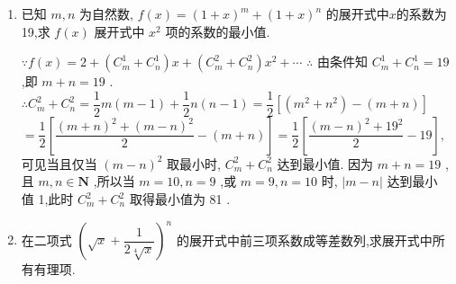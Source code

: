\begin{enumerate}
\begin{jieda}
    \begin{enumerate}
        \item  $x$ 3的二项式系数是 ${C}_{n}^{3}$ , $x$ 的二项式系数是 ${C}_{n}^{1}$ .依题意有 ${C}_{n}^{3} = 7{C}_{n}^{1}$ ,即 $\dfrac{n\left( {n - 1}\right) \left( {n - 2}\right) }{3!} = {7n}$ .整理,得${n}^{2} - {3n} - {40} = 0,$解得 $n = 8$ . (舍去 $n =  - 5$ .)
        \item 依题意,得
${C}_{7}^{5}{a}^{2} + {C}_{7}^{3}{a}^{4} = 2{C}_{7}^{4}{a}^{3},$即 ${21}{a}^{2} + {35}{a}^{4} = {70}{a}^{3}$ ,
$\because a \neq  0$ ,
$\therefore 5{a}^{2} - {10a} + 3 = 0$ .
解得 $a = 1 - \dfrac{\sqrt{10}}{5}$ 或 $a = 1 + \dfrac{\sqrt{10}}{5}$ .
    \end{enumerate}
\end{jieda}



\item 已知 $m,n$ 为自然数, $f(x)=(1+x)^{m}+(1+x)^{n}$ 的展开式中$x$的系数为19,求 $f(x)$ 展开式中 $x^{2}$ 项的系数的最小值.
\begin{jieda}
     $\because f\left( x\right)  = 2 + \left( {{{C}}_{m}^{1} + {{C}}_{n}^{1}}\right) x + \left( {{{C}}_{m}^{2} + {{C}}_{n}^{2}}\right) {x}^{2} + \cdots$
$\therefore$ 由条件知 ${{C}}_{m}^{1} + {{C}}_{n}^{1} = {19}$ ,即 $m + n = {19}$ .
$\therefore {{C}}_{m}^{2} + {{C}}_{n}^{2} = \dfrac{1}{2}m\left( {m - 1}\right)  + \dfrac{1}{2}n\left( {n - 1}\right)  = \dfrac{1}{2}\left\lbrack  {\left( {{m}^{2} + {n}^{2}}\right)  - \left( {m + n}\right) }\right\rbrack$
$= \dfrac{1}{2}\left\lbrack  {\dfrac{{\left( m + n\right) }^{2} + {\left( m - n\right) }^{2}}{2} - \left( {m + n}\right) }\right\rbrack   = \dfrac{1}{2}\left\lbrack  {\dfrac{{\left( m - n\right) }^{2} + {19}^{2}}{2} - {19}}\right\rbrack  ,$
可见当且仅当 ${\left( m - n\right) }^{2}$ 取最小时, ${{C}}_{m}^{2} + {{C}}_{n}^{2}$ 达到最小值.
因为 $m + n = {19}$ ,且 $m,n \in  \mathbf{N}$ ,所以当 $m = {10},n = 9$ ,或 $m = 9,n = {10}$ 时, $\left| {m - n}\right|$ 达到最小
值 1,此时 ${{C}}_{m}^{2} + {{C}}_{n}^{2}$ 取得最小值为 81 .
\end{jieda}



\item 在二项式 $(\sqrt{x}+\dfrac{1}{2\sqrt[4]{x}})^{n}$ 的展开式中前三项系数成等差数列,求展开式中所有有理项.


\end{enumerate}
